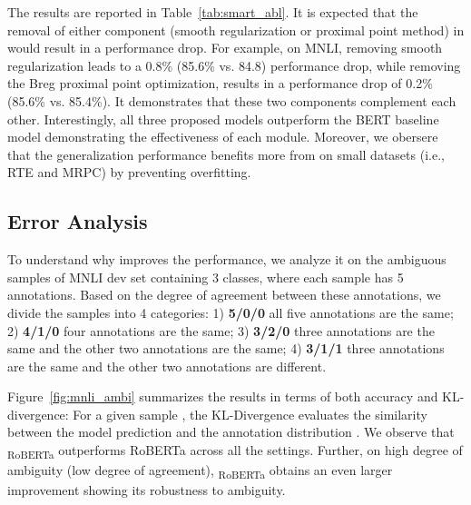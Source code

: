 The results are reported in Table~\ref{tab:smart_abl}. It is expected that the removal of either component (smooth regularization or proximal point method) in {\model} would result in a performance drop. For example, on MNLI, removing smooth regularization leads to a 0.8\% (85.6\% vs. 84.8) performance drop, while removing the Breg proximal point optimization, results in a performance drop of 0.2\% (85.6\% vs. 85.4\%). It demonstrates that these two components complement each other. Interestingly, all three proposed models outperform the BERT baseline model demonstrating the effectiveness of each module. Moreover, we obersere that the generalization performance benefits more from {\model}  on small datasets (i.e., RTE and MRPC) by preventing overfitting. 





















\subsection{Error Analysis}
\label{subsec:error}
To understand why {\model} improves the performance, we analyze it on the ambiguous samples of MNLI dev set containing 3 classes, where each sample has 5 annotations. Based on the degree of agreement between these annotations, we divide the samples into 4 categories: 
1) \textbf{5/0/0} all five annotations are the same; 2) \textbf{4/1/0} four annotations are the same; 3) \textbf{3/2/0} three annotations are the same and the other two annotations are the same; 4) \textbf{3/1/1} three annotations are the same and the other two annotations are different.

Figure~\ref{fig:mnli_ambi} summarizes the results in terms of both accuracy and KL-divergence:  For a given sample , the KL-Divergence evaluates the similarity between the model prediction  and the annotation distribution . We observe that {\model}\textsubscript{RoBERTa} outperforms RoBERTa across all the settings. Further, on high degree of ambiguity (low degree of agreement), {\model}\textsubscript{RoBERTa} obtains an even larger improvement showing its robustness to ambiguity.  
 



